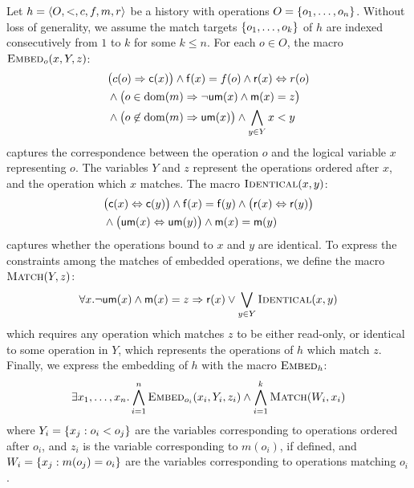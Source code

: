 Let $h = \tup{O,<,c,f,m,r}$ be a history with operations $O = \set{ o_1, \ldots,
o_n }$. Without loss of generality, we assume the match targets $\set{o_1,
\ldots, o_k}$ of $h$ are indexed consecutively from $1$ to $k$ for some $k \le
n$. For each $o \in O$, the macro $\textsc{Embed}_o(x,Y,z)$:
\begin{align*}
  & \big(c(o) \implies {\sf c}(x)\big) \land {\sf f}(x) = f(o) \land {\sf r}(x) \Leftrightarrow r(o) \\
  & \land \big(o \in \dom(m)
    \implies \lnot{\sf um}(x) \land {\sf m}(x) = z\big) \\
  & \land \big(o \not\in \dom(m) \implies {\sf um}(x)\big)
    \land \bigwedge_{y \in Y} x < y
\end{align*}
captures the correspondence between the operation $o$ and the logical variable
$x$ representing $o$. The variables $Y$ and $z$ represent the operations
ordered after $x$, and the operation which $x$ matches. The macro
$\textsc{Identical}(x,y)$:
\begin{align*}
  & \big({\sf c}(x) \Leftrightarrow {\sf c}(y)\big)
    \land {\sf f}(x) = {\sf f}(y)
    \land \big({\sf r}(x) \Leftrightarrow {\sf r}(y)\big) \\
  & \land \big({\sf um}(x) \Leftrightarrow {\sf um}(y)\big)
    \land {\sf m}(x) = {\sf m}(y)
\end{align*}
captures whether the operations bound to $x$ and $y$ are identical.
To express the constraints among the matches of embedded operations, we define
the macro $\textsc{Match}(Y,z)$:
\begin{align*}
  \forall x.
  \lnot{\sf um}(x) \land
  {\sf m}(x) = z \implies
  {\sf r}(x) \lor \bigvee_{y \in Y} \textsc{Identical}(x,y)
\end{align*}
which requires any operation which matches $z$ to be either read-only, or
identical to some operation in $Y$, which represents the operations of $h$
which match $z$. Finally, we express the embedding of $h$ with the macro
$\textsc{Embed}_h$:
\begin{align*}
  \exists x_1, \ldots, x_n.
  \bigwedge_{i=1}^{n} \textsc{Embed}_{o_i}(x_i,Y_i,z_i)
  \land \bigwedge_{i=1}^{k} \textsc{Match}(W_i, x_i)
\end{align*}
where $Y_i = \set{ x_j : o_i < o_j }$ are the variables corresponding to
operations ordered after $o_i$, and $z_i$ is the variable corresponding to
$m(o_i)$, if defined, and $W_i = \set{ x_j : m(o_j) = o_i }$ are the variables
corresponding to operations matching $o_i$.

